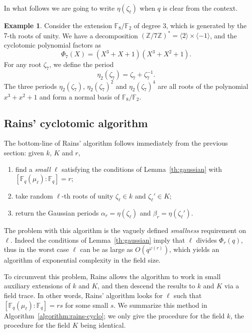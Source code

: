 \documentclass[12pt]{article}
\theoremstyle{plain}
\theoremstyle{definition}
\newtheorem{example}[theorem]{Example}
\def\Z{\ensuremath{\mathbb{Z}}}
\def\F{\ensuremath{\mathbb{F}}}
\def\euler{\ensuremath{\varphi}}
\newcounter{algorithm}
\begin{document}
In what follows we are going to write $\eta(\zeta_\ell)$ when $q$ is
clear from the context.

\begin{example} 
  Consider the extension $\F_8/\F_2$ of degree $3$, which is generated
  by the $7$-th roots of unity. We have a decomposition
  $(\Z/7\Z)^\ast=\langle 2\rangle\times\langle-1\rangle$, and the
  cyclotomic polynomial factors as
  \begin{equation}
    \Phi_7(X) = (X^3 + X + 1) (X^3 + X^2 + 1).
  \end{equation}
  For any root $\zeta_7$, we define the period
  \begin{equation}
    \eta_2(\zeta_7) = \zeta_7+\zeta_7^{-1}.
  \end{equation}
  The three periods $\eta_2(\zeta_7)$, $\eta_2(\zeta_7)^2$ and
  $\eta_2(\zeta_7)^4$ are all roots of the polynomial $x^3+x^2+1$ and
  form a normal basis of $\F_8/\F_2$.
\end{example}

\subsection{Rains' cyclotomic algorithm}

The bottom-line of Rains' algorithm follows immediately from the
previous section: given $k$, $K$ and $r$,
\begin{enumerate}
\item find a \emph{small} $\ell$ satisfying the conditions of
  Lemma~\ref{th:gaussian} with $[\F_q(\mu_\ell):\F_q]=r$;
\item take random $\ell$-th roots of unity $\zeta_\ell\in k$ and
  $\zeta_\ell'\in K$;
\item return the Gaussian periods $\alpha_r=\eta(\zeta_\ell)$ and
  $\beta_r=\eta(\zeta_\ell')$.
\end{enumerate}

The problem with this algorithm is the vaguely defined
\emph{smallness} requirement on $\ell$. Indeed the conditions of
Lemma~\ref{th:gaussian} imply that $\ell$ divides $\Phi_r(q)$, thus in
the worst case $\ell$ can be as large as $O(q^{\euler(r)})$, which
yields an algorithm of exponential complexity in the field size.

To circumvent this problem, Rains allows the algorithm to work in
small auxiliary extensions of $k$ and $K$, and then descend the
results to $k$ and $K$ via a field trace. In other words, Rains'
algorithm looks for $\ell$ such that $[\F_q(\mu_\ell):\F_q]=rs$ for
some small $s$. We summarize this method in
Algorithm~\ref{algorithm:rains-cyclo}; we only give the procedure for
the field $k$, the procedure for the field $K$ being identical.
\end{document}

